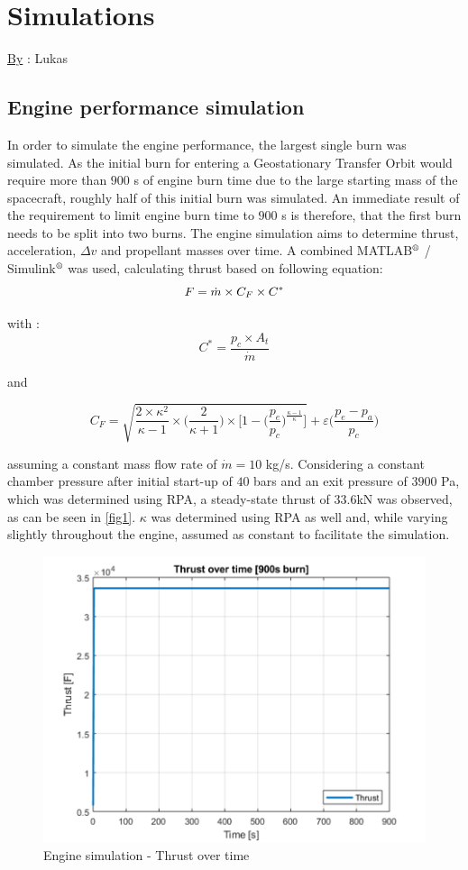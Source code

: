 \chapter{Simulations}
\qquad \underline{By} : Lukas
\label{chap:sim}
\section{Engine performance simulation}
\qquad In order to simulate the engine performance, the largest single burn was simulated. As the initial burn for entering a Geostationary Transfer Orbit would require more than $900$ s of engine burn time due to the large starting mass of the spacecraft, roughly half of this initial burn was simulated. An immediate result of the requirement to limit engine burn time to $900$ s is therefore, that the first burn needs to be split into two burns. The engine simulation aims to determine thrust, acceleration, $\Delta v$ and propellant masses over time. A combined MATLAB$^{\mbox{\scriptsize{\textregistered}}}$  / Simulink$^{\mbox{\scriptsize{\textregistered}}}$  was used, calculating thrust based on following equation:
\begin{equation}
	F = \dot m \times C_F \times C^*\\
\end{equation}

with : 
$$
C^* = \frac{p_c\times A_t}{\dot{m}}
$$

and

$$
C_F = \sqrt{\frac{2\times \kappa^2}{\kappa - 1}\times \bigg(\frac{2}{\kappa + 1}\bigg)\times\bigg[1 - \bigg(\frac{p_e}{p_c}\bigg)^{\frac{\kappa - 1}{\kappa}}\bigg]} + \varepsilon\bigg(\frac{p_e-p_a}{p_c}\bigg)
$$

assuming a constant mass flow rate of $\dot{m} = 10$ kg/s. Considering a constant chamber pressure after initial start-up of $40$ bars and an exit pressure of $3900$ Pa, which was determined using RPA, a steady-state thrust of $33.6$kN was observed, as can be seen in \autoref{fig1}. $\kappa$ was determined using RPA as well and, while varying slightly throughout the engine, assumed as constant to facilitate the simulation.

\begin{figure}[H]
	\centering\includegraphics[width=0.9\linewidth]{thrusttime}
	\caption{Engine simulation - Thrust over time}\label{fig1}
\end{figure}

